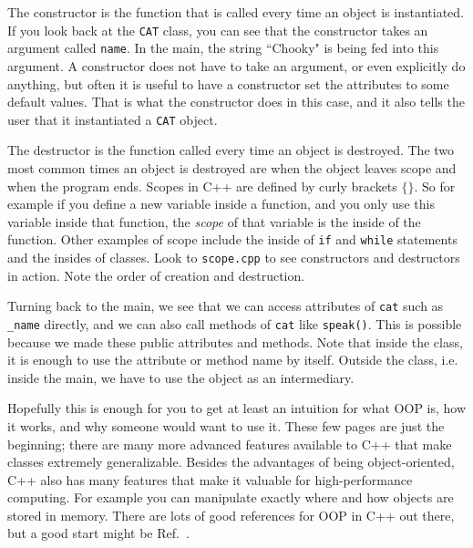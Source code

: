 The constructor is the function that is called every time an object is
instantiated. If you look back at the \texttt{CAT} class, you can see that
the constructor takes an argument called \texttt{name}. In the main,
the string ``Chooky" is being fed into this argument. A constructor does
not have to take an argument, or even explicitly do anything, but often
it is useful to have a constructor set the attributes to some default values.
That is what the constructor does in this case, and it also tells the
user that it instantiated a \texttt{CAT} object.



The destructor is the function called every time an object is destroyed.
The two most common times an object is destroyed are when the object
leaves scope and when the program ends. Scopes in C++ are defined by
curly brackets $\{\}$. So for example if you define a new variable
inside a function, and you only use this variable inside that function,
the {\it scope} of that variable is the inside of the function. 
Other examples of scope include
the inside of \texttt{if} and \texttt{while} statements and the
insides of classes. Look to \texttt{scope.cpp} to see constructors and
destructors in action. Note the order of creation and destruction.

Turning back to the main, we see that we can access attributes of
\texttt{cat} such as \texttt{\_name} directly, and we can also call
methods of \texttt{cat} like \texttt{speak()}. This is possible because
we made these public attributes and methods. Note that inside the class,
it is enough to use the attribute or method name by itself. Outside the
class, i.e. inside the main, we have to use the object as an intermediary.




Hopefully this is enough for you to get at least an intuition for
what OOP is, how it works, and why someone would want to use it. These
few pages are just the beginning; there are many more advanced
features available to C++ that make classes extremely generalizable.
Besides the advantages of being object-oriented, C++ also has many
features that make it valuable for high-performance computing.
For example you can manipulate exactly where and how objects
are stored in memory. There are lots of good references for OOP
in C++ out there, but a good start might be Ref.~\cite{tp:cpp}.

